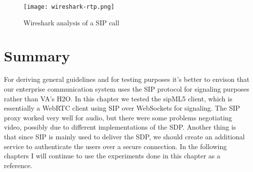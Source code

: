\begin{figure}[here]
\centerline{\texttt{[image: wireshark-rtp.png]}}
\caption{Wireshark analysis of a SIP call}
\label{fig:wireshark-sip-call}
\end{figure}

\newpage
\section{Summary}
For deriving general guidelines and for testing purposes it's better to envison that our enterprise communication system uses the SIP protocol for signaling purposes rather than VA's H2O. In this chapter we tested the sipML5 client, which is essentially a WebRTC client using SIP over WebSockets for signaling. The SIP proxy worked very well for audio, but there were some problems negotiating video, possibly due to different implementations of the SDP. Another thing is that since SIP is mainly used to deliver the SDP, we should create an additional service to authenticate the users over a secure connection. In the following chapters I will continue to use the experiments done in this chapter as a reference.